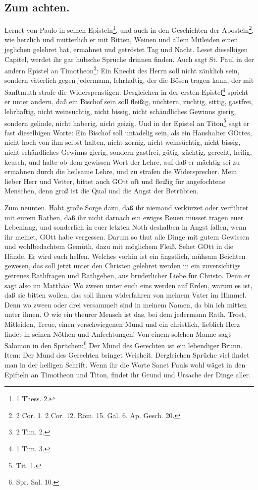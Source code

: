 \subsection*{Zum achten.}

Lernet von Paulo in seinen Episteln\footnote{1 Thess. 2.}, und auch in den Geschichten der Aposteln\footnote{2 Cor. 1. 2 Cor. 12. Röm. 15. Gal. 6. Ap. Gesch. 20.}, wie herzlich und mütterlich er mit Bitten, Weinen und allem Mitleiden einen jeglichen gelehret hat, ermahnet und getröstet Tag und Nacht. Leset dieselbigen Capitel, werdet ihr gar hübsche Sprüche drinnen finden. Auch sagt St. Paul in der andern Epistel an Timotheon\footnote{2 Tim. 2.}: Ein Knecht des Herrn soll nicht zänklich sein, sondern väterlich gegen jedermann,
lehrhaftig, der die Bösen tragen kann, der mit Sanftmuth strafe die Widerspenstigen. Desgleichen in der ersten Epistel\footnote{1 Tim. 3.} spricht er unter andern, daß ein Bischof sein soll fleißig, nüchtern, züchtig, sittig, gastfrei, lehrhaftig, nicht weinsüchtig, nicht bissig, nicht schändliches Gewinns gierig, sondern gelinde, nicht haberig, nicht geizig. Und in der Epistel an Titon\footnote{Tit. 1.} sagt er fast dieselbigen Worte: Ein Bischof soll untadelig sein, als ein Haushalter GOttes, nicht hoch von ihm selbst halten, nicht zornig, nicht weinsüchtig, nicht bissig, nicht schändliches Gewinns gierig, sondern gastfrei, gütig, züchtig, gerecht, heilig, keusch, und halte ob dem gewissen Wort der Lehre, auf daß er mächtig sei zu ermahnen durch die heilsame Lehre, und zu strafen die Widersprecher. Mein lieber Herr und Vetter, bittet auch GOtt oft und fleißig für angefochtene Menschen, denn groß ist die Qual und die Angst der Betrübten.

Zum neunten. Habt große Sorge dazu, daß ihr niemand verkürzet oder verführet mit eurem Rathen, daß ihr nicht darnach ein ewiges Reuen müsset tragen euer Lebenlang, und sonderlich in euer letzten Noth deshalben in Angst fallen, wenn ihr meinet, GOtt habe vergessen. Darum so thut alle Dinge mit gutem Gewissen und wohlbedachtem Gemüth, dazu mit möglichem Fleiß. Sehet GOtt in die Hände, Er wird euch helfen. Welches vorhin ist ein ängstlich, mühsam Beichten gewesen, das soll jetzt unter den Christen gelehret werden in ein zuversichtigs getreues Rathfragen und Rathgeben, aus brüderlicher Liebe für Christo. Denn er sagt also im Matthäo: Wo zween unter euch eins werden auf Erden, warum es ist, daß sie bitten wollen, das soll ihnen widerfahren von meinem Vater im Himmel. Denn wo zween oder drei versammelt sind in meinem
Namen, da bin ich mitten unter ihnen. O wie ein theurer Mensch ist das, bei dem jedermann Rath, Trost, Mitleiden, Treue, einen verschwiegenen Mund und ein christlich, lieblich Herz findet in seinen Nöthen und Anfechtungen! Von einem solchen Manne sagt Salomon in den Sprüchen:\footnote{Spr. Sal. 10.} Der Mund des Gerechten ist ein lebendiger Brunn. Item: Der Mund des Gerechten bringet Weisheit. Dergleichen Sprüche viel findet man in der heiligen Schrift. Wenn ihr die Worte Sanct Pauls wohl wäget in den Epifteln an Timotheon und Titon, findet ihr Grund und Ursache der Dinge aller.

